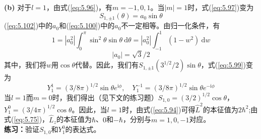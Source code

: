 \begin{examplebox}
        \textbf{(b)} 对于$l=1$，由式(\ref{eq:5.96})，有$m=-1, 0, 1$。当$\left|m\right| = 1$时，式(\ref{eq:5.97})变为
        \begin{equation}
            S_{1,\pm 1}\left(\theta\right) = a_0\sin\theta
            \label{eq:5.102}
        \end{equation}
        (\ref{eq:5.102})中的$a_0$和(\ref{eq:5.100})中的$a_0$不一定相等。由归一化条件，有
        \begin{equation*}
            1 = \left|a_0^2\right|\int_{0}^{\pi}\sin^2\theta\sin\theta \: \mathrm{d}\theta = \left|a_0^2\right|\int_{-1}^{1}\left(1-w^2\right) \: \mathrm{d}w
        \end{equation*}
        \begin{equation*}
            \left|a_0\right| = \sqrt{3}/2
        \end{equation*}
        其中，我们将$w$用$\cos\theta$代替。因此，我们有$S_{1,\pm 1}\left(3^{1/2}/2\right)\sin\theta$，式(\ref{eq:5.99})变为
        \begin{equation}
            Y_1^1 = \left(3/8\pi\right)^{1/2}\sin\theta e^{\mathrm{i}\phi}, \quad Y_1^{-1} = \left(3/8\pi\right)^{1/2}\sin\theta e^{-\mathrm{i}\phi}
            \label{eq:5.103}
        \end{equation}
        当$l=1$而$m=0$时，我们得出（见下文的练习题）$S_{1,0} = \left(3/2\right)^{1/2}\cos\theta$，$Y_1^0 = \left(3/4\pi\right)^{1/2}\cos\theta$。因此，当$l=1$时，由式(\ref{eq:5.94})可得$\hat{L}^2$的本征值为$2\hbar^2$;由式(\ref{eq:5.75})，$\hat{L}_z$的本征值为$\hbar$、$0$和$-\hbar$，分别与$m=1, 0, -1$对应。
        \\

        \textbf{练习：}验证$S_{1,0}$和$Y_1^0$的表达式。
    \end{examplebox}

